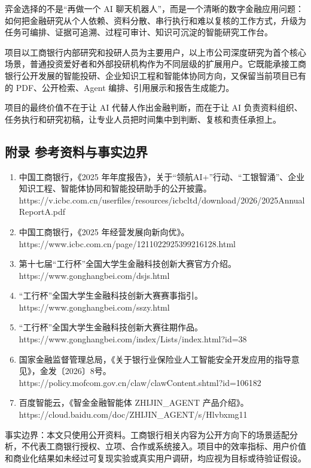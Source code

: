 \documentclass[a4paper,12pt,fontset=none]{ctexart}
\begin{document}
弈金选择的不是``再做一个 AI
聊天机器人''，而是一个清晰的数字金融应用问题：如何把金融研究从个人依赖、资料分散、串行执行和难以复核的工作方式，升级为任务可编排、证据可追溯、过程可审计、知识可沉淀的智能研究工作台。

项目以工商银行内部研究和投研人员为主要用户，以上市公司深度研究为首个核心场景，普通投资爱好者和外部投研机构作为不同层级的扩展用户。它既能承接工商银行公开发展的智能投研、企业知识工程和智能体协同方向，又保留当前项目已有的
PDF、公开检索、Agent 编排、引用展示和报告生成能力。

项目的最终价值不在于让 AI 代替人作出金融判断，而在于让 AI
负责资料组织、任务执行和研究初稿，让专业人员把时间集中到判断、复核和责任承担上。

\subsection{附录
参考资料与事实边界}\label{ux9644ux5f55-ux53c2ux8003ux8d44ux6599ux4e0eux4e8bux5b9eux8fb9ux754c}

\begin{enumerate}
\def\labelenumi{\arabic{enumi}.}
\item
  中国工商银行，《2025
  年年度报告》，关于``领航AI+''行动、``工银智涌''、企业知识工程、智能体协同和智能投研助手的公开披露。\\
  https://v.icbc.com.cn/userfiles/resources/icbcltd/download/2026/2025AnnualReportA.pdf
\item
  中国工商银行，《2025 年经营发展向新向优》。\\
  https://www.icbc.com.cn/page/1211022925399216128.html
\item
  第十七届``工行杯''全国大学生金融科技创新大赛官方介绍。\\
  https://www.gonghangbei.com/dsjs.html
\item
  ``工行杯''全国大学生金融科技创新大赛赛事指引。\\
  https://www.gonghangbei.com/sszy.html
\item
  ``工行杯''全国大学生金融科技创新大赛往期作品。\\
  https://www.gonghangbei.com/index/Lists/index.html?id=38
\item
  国家金融监督管理总局，《关于银行业保险业人工智能安全开发应用的指导意见》，金发〔2026〕8号。\\
  https://policy.mofcom.gov.cn/claw/clawContent.shtml?id=106182
\item
  百度智能云，《智金金融智能体 ZHIJIN\_AGENT 产品介绍》。\\
  https://cloud.baidu.com/doc/ZHIJIN\_AGENT/s/Hlvbxmg11
\end{enumerate}

事实边界：本文只使用公开资料。工商银行相关内容为公开方向下的场景适配分析，不代表工商银行授权、立项、合作或系统接入。项目中的效率指标、用户价值和商业化结果如未经过可复现实验或真实用户调研，均应视为目标或待验证假设。

\end{document}
